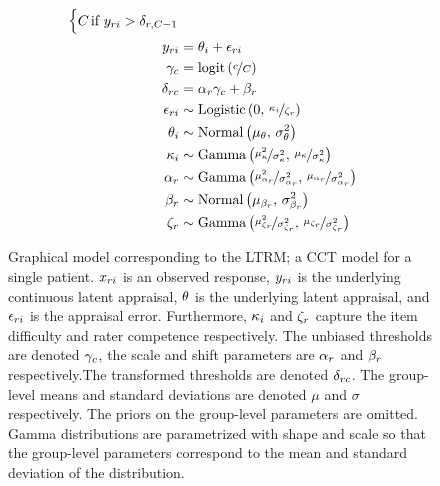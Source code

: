 \documentclass[a4paper,usenames,dvipsnames]{article}
\begin{document}
\begin{figure}[!ht]
\begin{minipage}{0.5\textwidth}
{\begin{align*}
\begin{cases}
			\Tncat	&\hspace{-.3cm} \text{if } \Appraisal_{\Irater\Iitem} > \Threshold_{\Irater, \Tncat-1}
			\end{cases}\\
			\Appraisal_{\Irater\Iitem} &\assignment \ItemTruth_\Iitem + \Error_{\Irater\Iitem}\\
			\UnBiasedThreshold_\Incat &\assignment \logit{\nicefrac{\Incat}{\Tncat}}\\
			\Threshold_{\Irater\Incat} &\assignment \RaterScale_\Irater \gamma_\Incat + \RaterShift_\Irater\\
			\Error_{\Irater\Iitem}   &\sim \dlogis{0}{\nicefrac{\ItemDifficulty_\Iitem}{\RaterCompetence_\Irater}} \\
			\ItemTruth_\Iitem        &\sim \dnorm{\mu_\ItemTruth}{\sigma_\ItemTruth^2}\\
			\ItemDifficulty_\Iitem   &\sim \dgammaMV{\mu_\ItemDifficulty}{\sigma_\ItemDifficulty^2} \\
			\RaterScale_\Irater      &\sim \dgammaMV{\mu_{\RaterScale_\Irater}}{\sigma_{\RaterScale_\Irater}^2} \\
			\RaterShift_\Irater      &\sim \dnorm{\mu_{\RaterShift_\Irater}}{\sigma_{\RaterShift_\Irater}^2} \\
			\RaterCompetence_\Irater &\sim \dgammaMV{\mu_{\RaterCompetence_\Irater}}{\sigma_{\RaterCompetence_\Irater}^2} \\
		\end{align*}
		}%
	\end{minipage}
	\caption{Graphical model corresponding to the LTRM; a CCT model for a single patient. $x_{ri}$ is an observed response, $y_{ri}$ is the underlying continuous latent appraisal, $\theta$ is the underlying latent appraisal, and $\epsilon_{ri}$ is the appraisal error. Furthermore, $\kappa_i$ and $\zeta_r$ capture the item difficulty and rater competence respectively. The unbiased thresholds are denoted $\gamma_c$, the scale and shift parameters are $\alpha_r$ and $\beta_r$ respectively.The transformed thresholds are denoted $\delta_{rc}$. The group-level means and standard deviations are denoted $\mu$ and $\sigma$ respectively. The priors on the group-level parameters are omitted. Gamma distributions are parametrized with shape and scale so that the group-level parameters correspond to the mean and standard deviation of the distribution.}
	\label{model:LTRM}
\end{figure}
\end{document}
